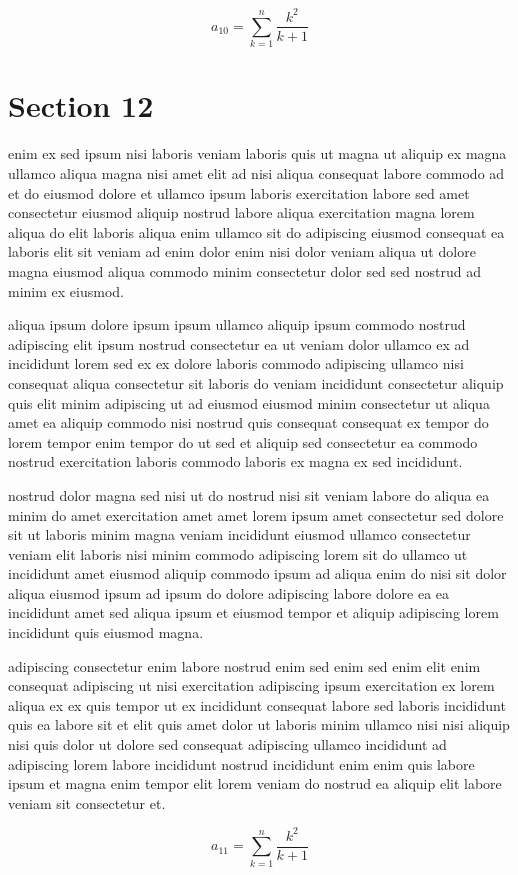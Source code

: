 \documentclass{article}
\begin{document}
\begin{equation} a_{10} = \sum_{k=1}^{n} \frac{k^2}{k+1} \end{equation}
\section{Section 12}
enim ex sed ipsum nisi laboris veniam laboris quis ut magna ut aliquip ex magna ullamco aliqua magna nisi amet elit ad nisi aliqua consequat labore commodo ad et do eiusmod dolore et ullamco ipsum laboris exercitation labore sed amet consectetur eiusmod aliquip nostrud labore aliqua exercitation magna lorem aliqua do elit laboris aliqua enim ullamco sit do adipiscing eiusmod consequat ea laboris elit sit veniam ad enim dolor enim nisi dolor veniam aliqua ut dolore magna eiusmod aliqua commodo minim consectetur dolor sed sed nostrud ad minim ex eiusmod.

aliqua ipsum dolore ipsum ipsum ullamco aliquip ipsum commodo nostrud adipiscing elit ipsum nostrud consectetur ea ut veniam dolor ullamco ex ad incididunt lorem sed ex ex dolore laboris commodo adipiscing ullamco nisi consequat aliqua consectetur sit laboris do veniam incididunt consectetur aliquip quis elit minim adipiscing ut ad eiusmod eiusmod minim consectetur ut aliqua amet ea aliquip commodo nisi nostrud quis consequat consequat ex tempor do lorem tempor enim tempor do ut sed et aliquip sed consectetur ea commodo nostrud exercitation laboris commodo laboris ex magna ex sed incididunt.

nostrud dolor magna sed nisi ut do nostrud nisi sit veniam labore do aliqua ea minim do amet exercitation amet amet lorem ipsum amet consectetur sed dolore sit ut laboris minim magna veniam incididunt eiusmod ullamco consectetur veniam elit laboris nisi minim commodo adipiscing lorem sit do ullamco ut incididunt amet eiusmod aliquip commodo ipsum ad aliqua enim do nisi sit dolor aliqua eiusmod ipsum ad ipsum do dolore adipiscing labore dolore ea ea incididunt amet sed aliqua ipsum et eiusmod tempor et aliquip adipiscing lorem incididunt quis eiusmod magna.

adipiscing consectetur enim labore nostrud enim sed enim sed enim elit enim consequat adipiscing ut nisi exercitation adipiscing ipsum exercitation ex lorem aliqua ex ex quis tempor ut ex incididunt consequat labore sed laboris incididunt quis ea labore sit et elit quis amet dolor ut laboris minim ullamco nisi nisi aliquip nisi quis dolor ut dolore sed consequat adipiscing ullamco incididunt ad adipiscing lorem labore incididunt nostrud incididunt enim enim quis labore ipsum et magna enim tempor elit lorem veniam do nostrud ea aliquip elit labore veniam sit consectetur et.

\begin{equation} a_{11} = \sum_{k=1}^{n} \frac{k^2}{k+1} \end{equation}
\end{document}
